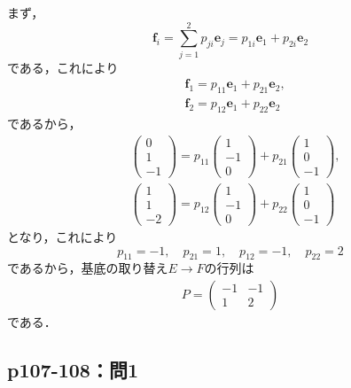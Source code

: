 \documentclass[uplatex,dvipdfmx,a4paper,10pt,fleqn]{jsarticle}
\begin{document}
\begin{leftbar}
まず，
\begin{equation*}
\bm{f}_i=\sum^{2}_{j=1}p_{ji}\bm{e}_{j}=p_{1i}\bm{e}_1+p_{2i}\bm{e}_2
\end{equation*}
である，これにより
\begin{align*}
& \bm{f}_1=p_{11}\bm{e}_1+p_{21}\bm{e}_2, \\
& \bm{f}_2=p_{12}\bm{e}_1+p_{22}\bm{e}_2 
\end{align*}
であるから，
\begin{align*}
&
\begin{pmatrix}
0 \\
1 \\
-1 
\end{pmatrix}
=
p_{11}
\begin{pmatrix}
1 \\
-1 \\
0 
\end{pmatrix}
+p_{21}
\begin{pmatrix}
1 \\
0 \\
-1 
\end{pmatrix}
,\\ 
&
\begin{pmatrix}
1 \\
1 \\
-2 
\end{pmatrix}
=
p_{12}
\begin{pmatrix}
1 \\
-1 \\
0 
\end{pmatrix}
+p_{22}
\begin{pmatrix}
1 \\
0 \\
-1 
\end{pmatrix}
\end{align*}
となり，これにより
\[
p_{11}=-1,\quad p_{21}=1,\quad p_{12}=-1,\quad p_{22}=2
\]
であるから，基底の取り替え$E \to F$の行列は
\begin{align*}
P=
\begin{pmatrix}
-1 & -1 \\
1 & 2 
\end{pmatrix}
\end{align*}
である．
\end{leftbar}

\newpage 
\subsection*{p107-108：問1}
\end{document}
